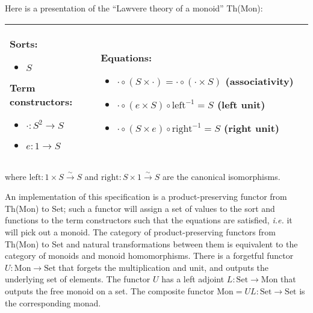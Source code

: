 \documentclass{llncs}
\newcommand{\maps}{\colon}
\renewcommand{\:}{\colon}
\newcommand{\Set}{\mathrm{Set}}
\newcommand{\Mon}{\mathrm{Mon}}
\newcommand{\leftu}{\mathrm{left}}
\newcommand{\rightu}{\mathrm{right}}
\begin{document}
Here is a presentation of the ``Lawvere theory of a monoid'' Th(Mon):
\begin{center}
  \begin{longtable}{|p{0.3\linewidth}|p{0.7\linewidth}|}
    \hline
      Sorts:
      \begin{itemize}
        \item $S$
      \end{itemize}\bigskip
      Term constructors:
      \begin{itemize}
        \item $\cdot\maps S^2 \to S$
        \item $e\maps 1 \to S$
      \end{itemize}
    &
      Equations:
      \begin{itemize}
        \item $\cdot \circ (S \times \cdot) = \cdot \circ (\cdot \times S)$ (associativity)
        \item $\cdot \circ (e \times S) \circ \leftu^{-1} = S$ (left unit)
        \item $\cdot \circ (S \times e) \circ \rightu^{-1} = S$ (right unit)        
      \end{itemize}\\
    \hline
  \end{longtable}
\end{center}
where ${\leftu\maps 1 \times S \stackrel{\sim}{\to} S}$ and ${\rightu\maps S \times 1 \stackrel{\sim}{\to} S}$ are the canonical isomorphisms.

An implementation of this specification is a product-preserving functor from Th(Mon) to Set; such a functor will assign a set of values to the sort and functions to the term constructors such that the equations are satisfied, {\em i.e.} it will pick out a monoid.  The category of product-preserving functors from Th(Mon) to Set and natural transformations between them is equivalent to the category of monoids and monoid homomorphisms.  There is a forgetful functor $U\maps \Mon \to \Set$ that forgets the multiplication and unit, and outputs the underlying set of elements.  The functor $U$ has a left adjoint $L\maps \Set \to \Mon$ that outputs the free monoid on a set.  The composite functor $\Mon = UL\maps \Set \to \Set$ is the corresponding monad.
\end{document}
